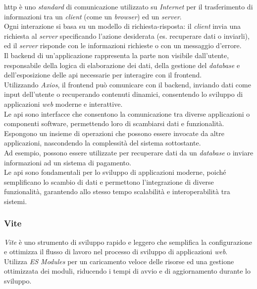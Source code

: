 \noindent \gls{http} è uno \textit{standard} di comunicazione utilizzato su \textit{Internet} per il trasferimento di informazioni tra un \textit{client} (come un \textit{browser}) ed un \textit{server}.\\
Ogni interazione si basa su un modello di richiesta-risposta: il \textit{client} invia una richiesta al \textit{server} specificando l’azione desiderata (es. recuperare dati o inviarli), ed il \textit{server} risponde con le informazioni richieste o con un messaggio d’errore.\\

\noindent Il \gls{backend} di un’applicazione rappresenta la parte non visibile dall'utente, responsabile della logica di elaborazione dei dati, della gestione del \textit{database} e dell’esposizione delle \gls{api} necessarie per interagire con il \gls{frontend}.\\
Utilizzando \textit{Axios}, il \gls{frontend} può comunicare con il \gls{backend}, inviando dati come input dell’utente o recuperando contenuti dinamici, consentendo lo sviluppo di applicazioni \textit{web} moderne e interattive.\\

\noindent Le \gls{api} sono interfacce che consentono la comunicazione tra diverse applicazioni o componenti software, permettendo loro di scambiarsi dati e funzionalità. \\
Espongono un insieme di operazioni che possono essere invocate da altre applicazioni, nascondendo la complessità del sistema sottostante.\\
Ad esempio, possono essere utilizzate per recuperare dati da un \textit{database} o inviare informazioni ad un sistema di pagamento.\\

\noindent Le \gls{api} sono fondamentali per lo sviluppo di applicazioni moderne, poiché semplificano lo scambio di dati e permettono l’integrazione di diverse funzionalità, garantendo allo stesso tempo scalabilità e interoperabilità tra sistemi.

\subsubsection{Vite}

\textit{Vite} è uno strumento di sviluppo rapido e leggero che semplifica la configurazione e ottimizza il flusso di lavoro nel processo di sviluppo di applicazioni \textit{web}. \\
Utilizza \textit{ES Modules} per un caricamento veloce delle risorse ed una gestione ottimizzata dei moduli, riducendo i tempi di avvio e di aggiornamento durante lo sviluppo.\\

